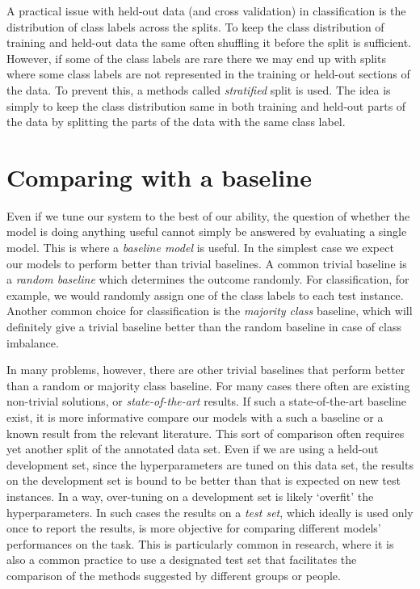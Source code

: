 A practical issue with held-out data (and cross validation) in classification
is the distribution of class labels across the splits.
To keep the class distribution of training and held-out data the same
often shuffling it before the split is sufficient.
However, if some of the class labels are rare there we may end up with 
splits where some class labels are not represented
in the training or held-out sections of the data.
To prevent this,
a methods called \emph{stratified} split is used.
The idea is simply to keep the class distribution same in
both training and held-out parts of the data
by splitting the parts of the data with the same class label.

\section{Comparing with a baseline}

Even if we tune our system to the best of our ability,
the question of whether the model is doing anything useful cannot simply
be answered by evaluating a single model.
This is where a \emph{baseline model} is useful.
In the simplest case we expect our models
to perform better than trivial baselines.
A common trivial baseline is a \emph{random baseline}
which determines the outcome randomly.
For classification, for example,
we would randomly assign one of the class labels to each test instance.
Another common choice for classification is
the \emph{majority class} baseline,
which will definitely give a trivial baseline
better than the random baseline in case of class imbalance.

In many problems, however, there are other trivial baselines
that perform better than a random or majority class baseline.
For many cases there often are existing non-trivial solutions,
or \emph{state-of-the-art} results.
If such a state-of-the-art baseline exist,
it is more informative compare our models
with a such a baseline or a known result
from the relevant literature.
This sort of comparison often requires yet another split
of the annotated data set.
Even if we are using a held-out development set,
since the hyperparameters are tuned on this data set,
the results on the development set is bound to be better
than that is expected on new test instances.
In a way,
over-tuning on a development set is likely `overfit' the hyperparameters.
In such cases the results on a \emph{test set},
which ideally is used only once to report the results, is more objective
for comparing different models' performances on the task.
This is particularly common in research,
where it is also a common practice to use a designated test set
that facilitates the comparison of the methods suggested
by different groups or people.

